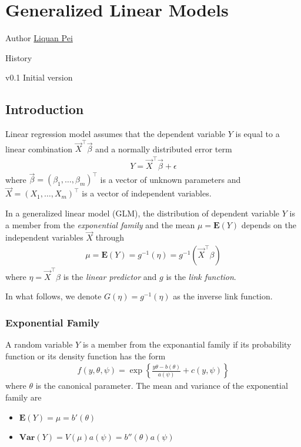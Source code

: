
\chapter[Generalized Linear Models]{Generalized Linear Models}

\begin{moduleinfo}
\item[Author] \href{mailto:lpei@gopivotal.com}{Liquan Pei}
\item[History]
    \begin{modulehistory}
        \item[v0.1] Initial version
    \end{modulehistory}
\end{moduleinfo}


\section{Introduction}

Linear regression model assumes that the dependent variable $Y$ is equal to a linear combination $\vec{X}^\top \vec{\beta}$ and a normally distributed error term
\begin{align*}
Y = \vec{X}^\top \vec{\beta} + \epsilon
\end{align*}
where $\vec{\beta} = (\beta_{1}, \dots, \beta_{m})^\top$ is a vector of unknown parameters and $\vec{X} = (X_1, \dots, X_{m})^\top$ is a vector of independent variables.

In a generalized linear model (GLM), the distribution of dependent variable $Y$ is a member from the \emph{exponential family} and the mean $\mu = \mathbf{E}(Y)$ depends on the independent variables $\vec{X}$ through
\begin{align*}
\mu = \mathbf{E}(Y) = g^{-1}(\eta) =g^{-1}(\vec{X}^\top \beta)
\end{align*}
where $\eta = \vec{X}^\top \beta$ is the \emph{linear predictor} and $g$ is the \emph{link function}.

In what follows, we denote $G(\eta) = g^{-1}(\eta)$ as the inverse link function.

\subsection{Exponential Family}
A random variable $Y$ is a member from the exponantial family if its probability function or its density function has the form
\begin{align*}
f(y,\theta, \psi) = \exp \left\{ \frac{y\theta - b(\theta)}{a(\psi)} + c(y, \psi)\right\}
\end{align*}
where $\theta$ is the canonical parameter.
The mean and variance of the exponential family are
\begin{itemize}
\item $\mathbf{E}(Y) = \mu = b'(\theta)$
\item $\mathbf{Var}(Y) = V(\mu)a(\psi) = b''(\theta)a(\psi)$
\end{itemize}

